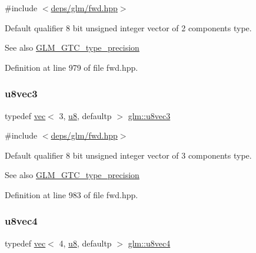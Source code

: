 {\ttfamily \#include $<$\hyperlink{fwd_8hpp}{deps/glm/fwd.\+hpp}$>$}

Default qualifier 8 bit unsigned integer vector of 2 components type. \begin{DoxySeeAlso}{See also}
\hyperlink{group__gtc__type__precision}{G\+L\+M\+\_\+\+G\+T\+C\+\_\+type\+\_\+precision} 
\end{DoxySeeAlso}


Definition at line 979 of file fwd.\+hpp.

\mbox{\label{group__gtc__type__precision_gaa86b325e581afdc643495fbe428c1f1b}} 
\subsubsection{\texorpdfstring{u8vec3}{u8vec3}}
{\footnotesize\ttfamily typedef \hyperlink{structglm_1_1vec}{vec}$<$ 3, \hyperlink{group__gtc__type__precision_ga5e3dc67373d5068997d2d9f41c9024d2}{u8}, defaultp $>$ \hyperlink{group__gtc__type__precision_gaa86b325e581afdc643495fbe428c1f1b}{glm\+::u8vec3}}



{\ttfamily \#include $<$\hyperlink{fwd_8hpp}{deps/glm/fwd.\+hpp}$>$}

Default qualifier 8 bit unsigned integer vector of 3 components type. \begin{DoxySeeAlso}{See also}
\hyperlink{group__gtc__type__precision}{G\+L\+M\+\_\+\+G\+T\+C\+\_\+type\+\_\+precision} 
\end{DoxySeeAlso}


Definition at line 983 of file fwd.\+hpp.

\mbox{\label{group__gtc__type__precision_ga6c8841fa492bd5b1078b171452fd6974}} 
\subsubsection{\texorpdfstring{u8vec4}{u8vec4}}
{\footnotesize\ttfamily typedef \hyperlink{structglm_1_1vec}{vec}$<$ 4, \hyperlink{group__gtc__type__precision_ga5e3dc67373d5068997d2d9f41c9024d2}{u8}, defaultp $>$ \hyperlink{group__gtc__type__precision_ga6c8841fa492bd5b1078b171452fd6974}{glm\+::u8vec4}}



